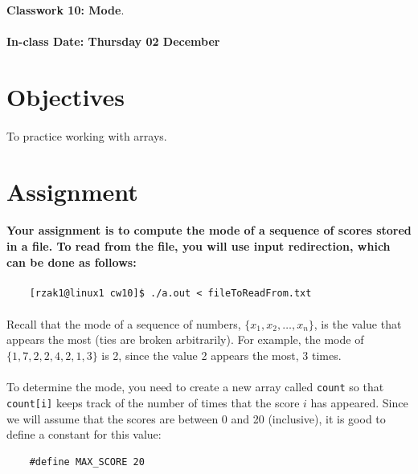 \documentclass[letter,11pt]{article}
\begin{document}
\huge
\textbf{Classwork 10: Mode}.
\normalsize
\\ ~~ \\
\textbf{In-class Date: Thursday 02 December}

\section*{Objectives}
\paragraph{}To practice working with arrays.

\section*{Assignment}
\paragraph{Your assignment is to compute the mode of a sequence of scores stored in a file. To read from the file, you will use input redirection, which can be done as follows:}
\begin{verbatim}
    [rzak1@linux1 cw10]$ ./a.out < fileToReadFrom.txt
\end{verbatim}

\paragraph{}Recall that the mode of a sequence of numbers, $\{x_1, x_2, \ldots, x_n\}$, is the value that appears the most (ties are broken arbitrarily). For example, the mode of $\{1, 7, 2, 2, 4, 2, 1, 3\}$ is 2, since the value 2 appears the most, 3 times.

\paragraph{}To determine the mode, you need to create a new array called \texttt{count} so that \texttt{count[i]} keeps track of the number of times that the score $i$ has appeared. Since we will assume that the scores are between 0 and 20 (inclusive), it is good to define a constant for this value:
\begin{verbatim}
    #define MAX_SCORE 20
\end{verbatim}
\end{document}
